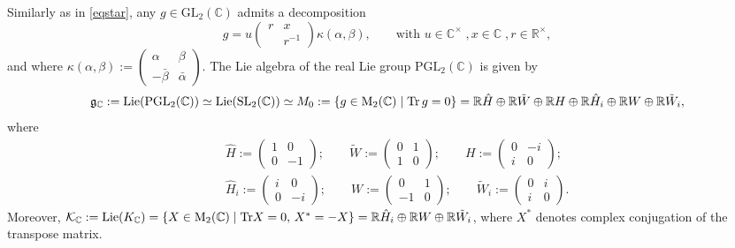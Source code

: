 \documentclass{amsart}
\theoremstyle{definition}
\theoremstyle{remark}
\numberwithin{equation}{section}
\newcommand{\M}{\mathrm{M}}
\newcommand{\PGL}{{\mathrm{PGL}}}
\newcommand{\GL}{{\mathrm{GL}}}
\newcommand{\SL}{{\mathrm {SL}}}
\newcommand{\C}{{\mathbb C}}
\newcommand{\R}{{\mathbb R}}
\newcommand{\cK}{{\mathcal K}}
\newcommand{\mfg}{{\mathfrak g}}
\begin{document}
Similarly as in \eqref{eqstar},
any $g\in\GL_2(\C)$ admits a decomposition
\begin{equation}\label{eqstar2}
g=u\left(\begin{array}{cc}r&x\\&r^{-1}\end{array}\right)\kappa(\alpha,\beta),\qquad \text{with } u\in\C^\times\;,x\in\C\;,r\in\R^\times,    
\end{equation}
and where $\kappa(\alpha,\beta):=\left(\begin{array}{cc}\alpha&\beta\\-\bar \beta&\bar \alpha\end{array}\right)$. The Lie algebra of the real Lie group $\PGL_2(\C)$ is given by 
\[
\mfg_\C:={\rm Lie}(\PGL_2(\C))\simeq{\rm Lie}(\SL_2(\C))\simeq M_0:=\{g\in\M_2(\C)\mid \operatorname{Tr} g=0\}=\R \hat H\oplus\R\tilde W\oplus\R H\oplus\R \hat H_i\oplus\R W\oplus\R \tilde W_i,
\]
where 
\begin{eqnarray*}
&&\hat H:=\left(\begin{array}{cc}
       1  & 0 \\
        0 & -1
    \end{array}\right);\qquad \tilde W:=\left(\begin{array}{cc}
       0  & 1 \\
        1 & 0
    \end{array}\right);\qquad H:=\left(\begin{array}{cc}
       0  & -i \\
        i & 0
    \end{array}\right);\\
    &&\hat H_i:=\left(\begin{array}{cc}
       i  & 0 \\
        0 & -i
    \end{array}\right);\qquad W:=\left(\begin{array}{cc}
       0  & 1 \\
        -1 & 0
    \end{array}\right);\qquad \tilde W_i:=\left(\begin{array}{cc}
       0  & i \\
        i & 0
    \end{array}\right).
\end{eqnarray*}
Moreover, $\cK_\C:={\rm Lie}(K_\C)=\{X\in \M_2(\C)\mid  {\rm Tr}X=0, \, X^\ast=-X\}=\R \hat H_i\oplus\R W\oplus\R \tilde W_i$, where $X^\ast$ denotes complex conjugation of the transpose matrix.
\end{document}
